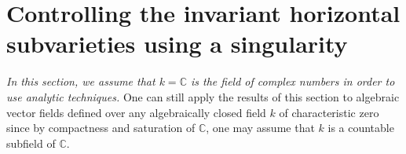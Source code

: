 \documentclass[12pt]{amsart}
\renewcommand{\P}{\mathbb{P}}
\theoremstyle{definition}
\theoremstyle{plain}
\theoremstyle{exampstyle}
\newtheorem{thmx}{Theorem}
\theoremstyle{exampstyle}\newtheorem{thmxbis}{Theorem}
\numberwithin{equation}{section}
\theoremstyle{remark}
\begin{document}
%
%


\section{Controlling the invariant horizontal subvarieties  using a singularity} 
\textit{In this section, we assume that $k = \mathbb{C}$ is the field of complex numbers in order to use analytic techniques.} One can still apply the results of this section to algebraic vector fields defined over any algebraically closed field $k$ of characteristic zero since by compactness and saturation of $\mathbb{C}$, one may assume that $k$ is a countable subfield of $\mathbb{C}$.


%
\end{document}
